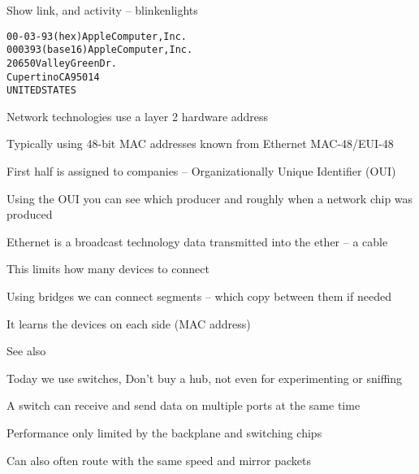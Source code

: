 \documentclass[Screen16to9,17pt]{foils}
\begin{document}





\centerline{Show link, and activity -- blinkenlights}




\begin{alltt}
00-03-93   (hex)        Apple Computer, Inc.
000393     (base 16)    Apple Computer, Inc.
                        20650 Valley Green Dr.
                        Cupertino CA 95014
                        UNITED STATES
\end{alltt}
\begin{list1}
\item Network technologies use a layer 2 hardware address
\item Typically using 48-bit MAC addresses known from Ethernet MAC-48/EUI-48
\item First half is assigned to companies -- Organizationally Unique Identifier (OUI)
\item Using the OUI you can see which producer and roughly when a network chip was produced
\item {}
\end{list1}



\begin{list1}
\item Ethernet is a broadcast technology data transmitted into the ether -- a cable
\item This limits how many devices to connect
\item Using bridges we can connect segments -- which copy between them if needed
\item It learns the devices on each side (MAC address)
\end{list1}

See also 




\begin{list1}
\item Today we use switches, Don't buy a hub, not even for experimenting or sniffing
\item A switch can receive and send data on multiple ports at the same time
\item Performance only limited by the backplane and switching chips
\item Can also often route with the same speed and mirror packets
\end{list1}
\end{document}
